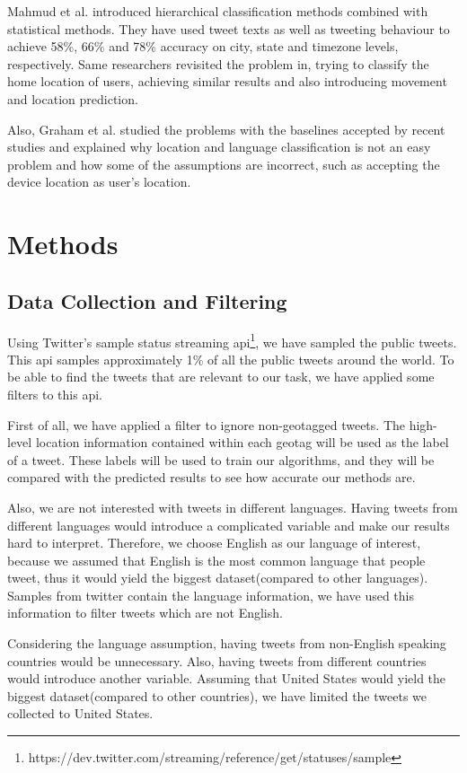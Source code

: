 \documentclass[twoside,11pt]{article}
\begin{document}
Mahmud et al. introduced hierarchical classification methods combined with statistical methods\cite{mahmud2012tweet}. They have used tweet texts as well as tweeting behaviour to achieve 58\%, 66\% and 78\% accuracy on city, state and timezone levels, respectively.  Same researchers revisited the problem in, trying to classify the home location of users, achieving similar results and also introducing movement and location prediction\cite{mahmud2014home}. 

Also, Graham et al. studied the problems with the baselines accepted by recent studies and explained why location and language classification is not an easy problem and how some of the assumptions are incorrect, such as accepting the device location as user's location\cite{graham2014world}. 

\section{Methods}

\subsection{Data Collection and Filtering}

Using Twitter's sample status streaming api\footnote{https://dev.twitter.com/streaming/reference/get/statuses/sample}, we have sampled the public tweets. This api samples approximately 1\% of all the public tweets around the world. To be able to find the tweets that are relevant to our task, we have applied some filters to this api. 

First of all, we have applied a filter to ignore non-geotagged tweets. The high-level location information contained within each geotag will be used as the label of a tweet. These labels will be used to train our algorithms, and they will be compared with the predicted results to see how accurate our methods are.

Also, we are not interested with tweets in different languages. Having tweets from different languages would introduce a complicated variable and make our results hard to interpret. Therefore, we choose English as our language of interest, because we assumed that English is the most common language that people tweet, thus it would yield the biggest dataset(compared to other languages). Samples from twitter contain the language information, we have used this information to filter tweets which are not English. 

Considering the language assumption, having tweets from non-English speaking countries would be unnecessary. Also, having tweets from different countries would introduce another variable. Assuming that United States would yield the biggest dataset(compared to other countries), we have limited the tweets we collected to United States.
\end{document}
